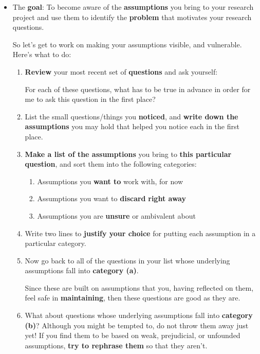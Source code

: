 \documentclass[11pt]{article}
\begin{document}
\begin{itemize}
\vspace{20pt}
\item \begin{exercise}

The \textbf{goal}: To become aware of the \textbf{assumptions} you bring to your research project and use them to identify the \textbf{problem} that motivates your research questions.

So let’s get to work on making your assumptions visible, and vulnerable. Here’s what to do:
\begin{enumerate}
\item \textbf{Review} your most recent set of \textbf{questions} and ask yourself: 

For each of these questions, what has to be true in advance in order for me to ask this question in the first place?

\item List the small questions/things you \textbf{noticed}, and \textbf{write down the assumptions} you may hold that helped you notice each in the first place.

\item \textbf{Make a list of the assumptions} you bring to \textbf{this particular question}, and sort them into the following categories:
\begin{enumerate}
\item Assumptions you \textbf{want to} work with, for now
\item Assumptions you want to \textbf{discard} \textbf{right away}
\item Assumptions you are \textbf{unsure} or ambivalent about
\end{enumerate}

\item Write two lines to \textbf{justify your choice} for putting each assumption in a particular category.

\item Now go back to all of the questions in your list whose underlying assumptions fall into \textbf{category (a)}. 

Since these are built on assumptions that you, having reflected on them, feel safe in \textbf{maintaining}, then these questions are good as they are.

\item What about questions whose underlying assumptions fall into \textbf{category (b)}? Although you might be tempted to, do not throw them away just yet! If you find them to be based on weak, prejudicial, or unfounded assumptions, \textbf{try to rephrase them} so that they aren’t. 


\end{enumerate}
\end{exercise}
\end{itemize}
\end{document}
